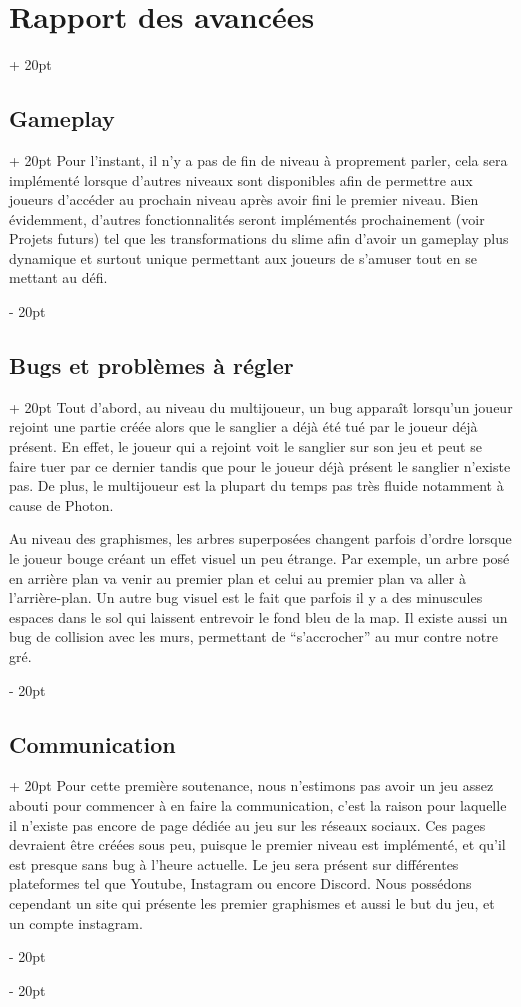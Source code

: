 \documentclass[a4paper, 12pt, twoside]{article}
\newcommand{\ind}[1][20pt]{\advance\leftskip + #1}
\newcommand{\deind}[1][20pt]{\advance\leftskip - #1}
\newenvironment{indt}[2][20pt]{#2 \par \ind[#1]}{\par \deind} %
\begin{document}
\begin{indt}{\section{Rapport des avancées}}
\begin{indt}{\subsection{Gameplay}}
            Pour l'instant, il n'y a pas de fin de niveau à proprement parler, cela sera implémenté lorsque d'autres niveaux sont disponibles afin de permettre aux joueurs d'accéder au prochain niveau après avoir fini le premier niveau. Bien évidemment, d'autres fonctionnalités seront implémentés prochainement (voir Projets futurs) tel que les transformations du slime afin d'avoir un gameplay plus dynamique et surtout unique permettant aux joueurs de s'amuser tout en se mettant au défi.

        \end{indt}

        \begin{indt}{\subsection{Bugs et problèmes à régler}}
            Tout d'abord, au niveau du multijoueur, un bug apparaît lorsqu'un joueur rejoint une partie créée alors que le sanglier a déjà été tué par le joueur déjà présent. En effet, le joueur qui a rejoint voit le sanglier sur son jeu et peut se faire tuer par ce dernier tandis que pour le joueur déjà présent  le sanglier n'existe pas. De plus, le multijoueur est la plupart du temps pas très fluide notamment à cause de Photon.

            Au niveau des graphismes, les arbres superposées changent parfois d'ordre lorsque le joueur bouge créant un effet visuel un peu étrange. Par exemple, un arbre posé en arrière plan va venir au premier plan et celui au premier plan va aller à l'arrière-plan. Un autre bug visuel est le fait que parfois il y a des minuscules espaces dans le sol qui laissent entrevoir le fond bleu de la map. Il existe aussi un bug de collision avec les murs, permettant de “s'accrocher” au mur contre notre gré.

        \end{indt}

        \begin{indt}{\subsection{Communication}}
            Pour cette première soutenance, nous n'estimons pas avoir un jeu assez abouti pour commencer à en faire la communication, c'est la raison pour laquelle il n'existe pas encore de page dédiée au jeu sur les réseaux sociaux. Ces pages devraient être créées sous peu, puisque le premier niveau est implémenté, et qu'il est presque sans bug à l'heure actuelle. Le jeu sera présent sur différentes plateformes tel que Youtube, Instagram ou encore Discord. Nous possédons cependant un site qui présente les premier graphismes et aussi le but du jeu, et un compte instagram.
        

\end{indt}
\end{indt}
\end{document}

